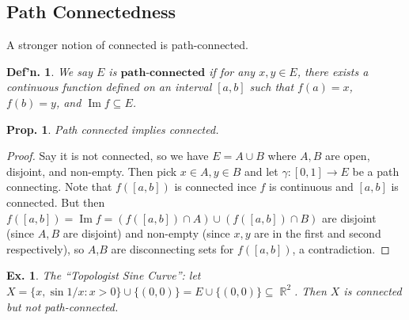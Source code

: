 \documentclass[12pt, a4paper]{book}
\DeclareMathOperator{\R}{\mathbb{R}}
\renewcommand{\Im}{\ensuremath{\operatorname{Im}}}
\newtheorem{definition}[theorem]{Def'n.}
\newtheorem{proposition}[theorem]{Prop.}
\newtheorem{example}[theorem]{Ex.}
\theoremstyle{nonumberplain}
\newtheorem{proof}{Proof}
\begin{document}
\subsection{Path Connectedness}
A stronger notion of connected is path-connected.
\begin{definition}
    We say $E$ is $\textbf{path-connected}$ if for any $x,y\in E$, there exists a continuous function defined on an interval
    $[a,b]$ such that $f(a)=x$, $f(b)=y$, and $\Im f\subseteq E$.
\end{definition}
\begin{proposition}
    Path connected implies connected.
\end{proposition}
\begin{proof}
    Say it is not connected, so we have $E=A\cup B$ where $A,B$ are open, disjoint, and non-empty. Then pick
    $x\in A,y\in B$ and let $\gamma:[0,1]\to E$ be a path connecting. Note that $f([a,b])$ is connected ince
    $f$ is continuous and $[a,b]$ is connected. But then $f([a,b])=\Im f=(f([a,b])\cap A)\cup(f([a,b])\cap B)$ are disjoint
    (since $A,B$ are disjoint) and non-empty (since $x,y$ are in the first and second respectively), so
    $A$,$B$ are disconnecting sets for $f([a,b])$, a contradiction.
\end{proof}
\begin{example}
    The ``Topologist Sine Curve'': let $X=\{x,\sin 1/x:x>0\}\cup\{(0,0)\}=E\cup\{(0,0)\}\subseteq\R^2$. Then $X$ is connected
    but not path-connected.
\end{example}
\end{document}
